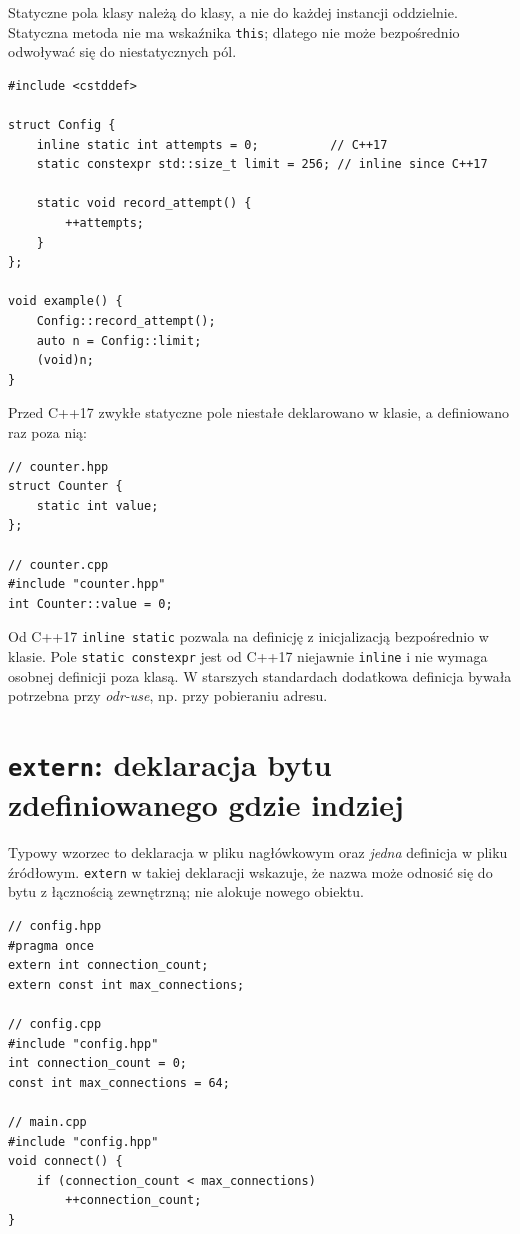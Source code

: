 Statyczne pola klasy należą do klasy, a nie do każdej instancji
oddzielnie. Statyczna metoda nie ma wskaźnika \texttt{this}; dlatego
nie może bezpośrednio odwoływać się do niestatycznych pól.

\begin{lstlisting}
#include <cstddef>

struct Config {
    inline static int attempts = 0;          // C++17
    static constexpr std::size_t limit = 256; // inline since C++17

    static void record_attempt() {
        ++attempts;
    }
};

void example() {
    Config::record_attempt();
    auto n = Config::limit;
    (void)n;
}
\end{lstlisting}

Przed C++17 zwykłe statyczne pole niestałe deklarowano w klasie,
a definiowano raz poza nią:

\begin{lstlisting}
// counter.hpp
struct Counter {
    static int value;
};

// counter.cpp
#include "counter.hpp"
int Counter::value = 0;
\end{lstlisting}

Od C++17 \texttt{inline static} pozwala na definicję z inicjalizacją
bezpośrednio w klasie. Pole \texttt{static constexpr} jest od C++17
niejawnie \texttt{inline} i nie wymaga osobnej definicji poza klasą.
W starszych standardach dodatkowa definicja bywała potrzebna przy
\emph{odr-use}, np. przy pobieraniu adresu.

\section{\texttt{extern}: deklaracja bytu zdefiniowanego gdzie indziej}

Typowy wzorzec to deklaracja w pliku nagłówkowym oraz \emph{jedna}
definicja w pliku źródłowym. \texttt{extern} w takiej deklaracji
wskazuje, że nazwa może odnosić się do bytu z łącznością zewnętrzną;
nie alokuje nowego obiektu.

\begin{lstlisting}
// config.hpp
#pragma once
extern int connection_count;
extern const int max_connections;

// config.cpp
#include "config.hpp"
int connection_count = 0;
const int max_connections = 64;

// main.cpp
#include "config.hpp"
void connect() {
    if (connection_count < max_connections)
        ++connection_count;
}
\end{lstlisting}

